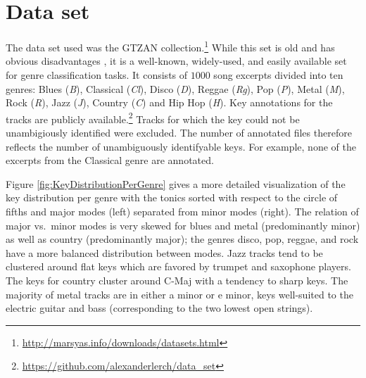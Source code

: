 \documentclass{article}
\begin{document}
\section{Data set}\label{sec:dataset}
The data set used was the GTZAN collection.\footnote{\url{http://marsyas.info/downloads/datasets.html}}
While this set
is old and has obvious disadvantages \cite{sturm_analysis_2012}, it is a well-known, widely-used, and easily available set for genre classification tasks. It consists of $1000$ song excerpts divided into ten genres: Blues (\textit{B}), Classical  (\textit{Cl}), Disco (\textit{D}), Reggae (\textit{Rg}), Pop (\textit{P}), Metal (\textit{M}), Rock (\textit{R}), Jazz (\textit{J}), Country (\textit{C}) and Hip Hop (\textit{H}). 
Key annotations for the tracks are publicly available.\footnote{\url{https://github.com/alexanderlerch/data_set}}%
Tracks for which the key could not be unambigiously identified were excluded. The number of annotated files therefore reflects the number of unambiguously identifyable keys.
For example, none of the excerpts from the Classical genre are annotated. 

Figure \ref{fig:KeyDistributionPerGenre} gives a more detailed visualization of the key distribution per genre with the tonics sorted with respect to the circle of fifths and major modes (left) separated from minor modes (right). 
The relation of major vs.\ minor modes is very skewed for blues and metal (predominantly minor) as well as country (predominantly major); the genres disco, pop, reggae, and rock have a more balanced distribution between modes. Jazz tracks tend to be clustered around flat keys which are favored by trumpet and saxophone players. The keys for country cluster around C-Maj with a tendency to sharp keys. The majority of metal tracks are in either a minor or e minor, keys well-suited to the electric guitar and bass (corresponding to the two lowest open strings).

\end{document}
